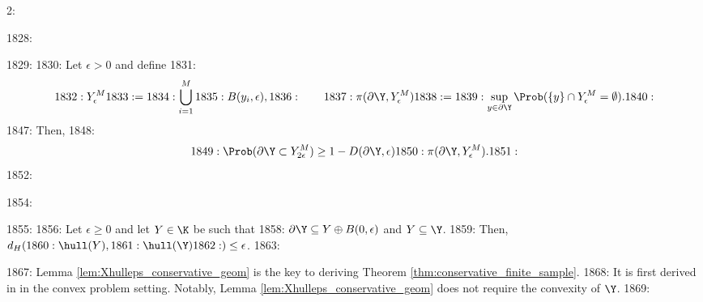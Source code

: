 2: \documentclass[12pt]{l4dc2022} %
\begin{document}
1828: \begin{lemma}%
1829: \label{lem:Xhulleps_conservative_geom}
1830: Let $\epsilon>0$ and define 
1831: $$
1832: Y_\epsilon^M
1833: =
1834: \underset{i=1}{\overset{M}{\bigcup}} \,
1835: B(y_i,\epsilon),
1836: \qquad
1837: \pi(\partial\Y,Y_\epsilon^M)
1838: =
1839: \sup_{y\in\partial\Y}\Prob(\{y\} \cap Y_\epsilon^M = \emptyset).
1840: $$  
1847: Then, 
1848: $$
1849: \Prob(\partial\Y\subset Y_{2\epsilon}^M) \geq 1 - D(\partial\Y,\epsilon)
1850: \pi(\partial\Y,Y_\epsilon^M).
1851: $$
1852: \end{lemma}

1854: \begin{lemma}%
1855: \label{lem:Hausdorff_hulls}
1856: Let $\epsilon\geq 0$ and let $Y\in\K$ be such that    
1858: $\partial\Y\subseteq Y\oplus B(0,\epsilon)$ and $Y\subseteq \Y$. 
1859: Then, $d_H(
1860: \hull(Y), 
1861: \hull(\Y)
1862: )\leq \epsilon$.
1863: \end{lemma}

1867: Lemma \ref{lem:Xhulleps_conservative_geom} is the key to deriving Theorem \ref{thm:conservative_finite_sample}. 
1868: It is first derived in \citep{Dumbgen1996} in the convex problem setting. Notably, Lemma \ref{lem:Xhulleps_conservative_geom} does not require the convexity of $\Y$.
1869: \\
\end{document}
